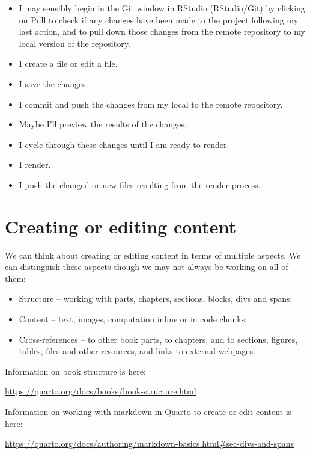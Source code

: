 \documentclass[
  letterpaper,
  DIV=11,
  numbers=noendperiod]{scrreprt}
\providecommand{\tightlist}{%
  \setlength{\itemsep}{0pt}\setlength{\parskip}{0pt}}
\begin{document}
\begin{itemize}
\tightlist
\item
  I may sensibly begin in the Git window in RStudio (RStudio/Git) by
  clicking on Pull to check if any changes have been made to the project
  following my last action, and to pull down those changes from the
  remote repository to my local version of the repository.
\item
  I create a file or edit a file.
\item
  I save the changes.
\item
  I commit and push the changes from my local to the remote repository.
\item
  Maybe I'll preview the results of the changes.
\item
  I cycle through these changes until I am ready to render.
\item
  I render.
\item
  I push the changed or new files resulting from the render process.
\end{itemize}

\section{Creating or editing content}\label{creating-or-editing-content}

We can think about creating or editing content in terms of multiple
aspects. We can distinguish these aspects though we may not always be
working on all of them:

\begin{itemize}
\tightlist
\item
  Structure -- working with parts, chapters, sections, blocks, divs and
  spans;
\item
  Content -- text, images, computation inline or in code chunks;
\item
  Cross-references -- to other book parts, to chapters, and to sections,
  figures, tables, files and other resources, and links to external
  webpages.
\end{itemize}

Information on book structure is here:

\url{https://quarto.org/docs/books/book-structure.html}

Information on working with markdown in Quarto to create or edit content
is here:

\url{https://quarto.org/docs/authoring/markdown-basics.html\#sec-divs-and-spans}
\end{document}
